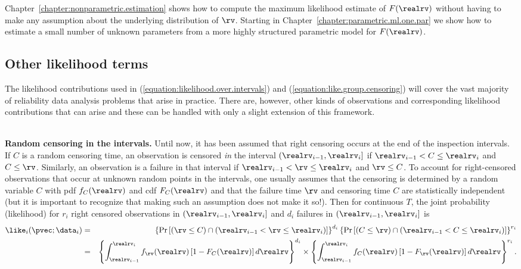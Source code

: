 Chapter~\ref{chapter:nonparametric.estimation} shows how to compute
the maximum likelihood estimate of $F(\realrv)$ without having to
make any assumption about the underlying distribution of $\rv$.
Starting in Chapter~\ref{chapter:parametric.ml.one.par} we show how to
estimate a small number of unknown parameters from a more highly
structured parametric model for $F(\realrv)$.

\subsection{Other likelihood terms}
The likelihood contributions used in 
(\ref{equation:likelihood.over.intervals}) 
and (\ref{equation:like.group.censoring}) will cover the
vast majority of reliability data analysis problems that
arise in practice. There are, however, other kinds of
observations and corresponding likelihood contributions
that can arise and these can
be handled with only a slight extension of this framework.

\mbox{  }\\
\noindent
{\bf Random censoring in the intervals.}
Until now, it has been assumed that right censoring occurs at the end of
the inspection intervals. If $C$ is a random censoring time, an
observation is censored {\em in} the interval $(\realrv_{i-1},
\realrv_{i}]$ if $\realrv_{i-1} < C \le \realrv_{i}$ and $C
\le \rv$.  Similarly, an observation is a failure in that interval if
$\realrv_{i-1} < \rv \le \realrv_{i}$ and $\rv \le C$. To account for
right-censored observations that occur at unknown random points 
in the intervals, one usually assumes that the censoring is determined 
by a random variable $C$ with
pdf $f_C(\realrv)$ and cdf $F_C(\realrv)$ and that the failure
time $\rv$ and censoring time $C$ are statistically independent
(but it is important to recognize that making such an assumption does
not make it so!).   Then for
continuous $T$, the joint probability (likelihood) for $r_{i}$ right
censored observations in $(\realrv_{i-1}, \realrv_{i}]$ and
$d_{i}$ failures in $(\realrv_{i-1}, \realrv_{i}]$ is
\begin{eqnarray}
\like_{i}(\pvec;\data_{i})&=&
 \left \{
 \Pr
 \left [
 \left (
      \rv \le  C
 \right )
  \cap
 \left (
 \realrv_{i-1} < \rv \le \realrv_{i}
 \right )
 \right ]
	  \right \}^{d_{i}}
 \left \{
 \Pr
 \left [
 \left (
   C \le  \rv
 \right )
  \cap
 \left (
 \realrv_{i-1} < C \le \realrv_{i}
 \right )
 \right ]
\right \}^{r_{i}} \nonumber
\\
\label{equation:like.censoring.in.interval}
&=&
 \left \{
\int_{\realrv_{i-1}}^{\realrv_{i}}
   f_{ \rv }(\realrv) \left [
	   1-F_{C}(\realrv)
	  \right ] d\realrv
\right \}^{d_{i}}
\times 
 \left \{
\int_{\realrv_{i-1}}^{\realrv_{i}}
   f_C(\realrv) \left [
	   1-F_{ \rv }(\realrv)
	  \right ]d\realrv
\right \}^{r_{i}}.
\end{eqnarray}

